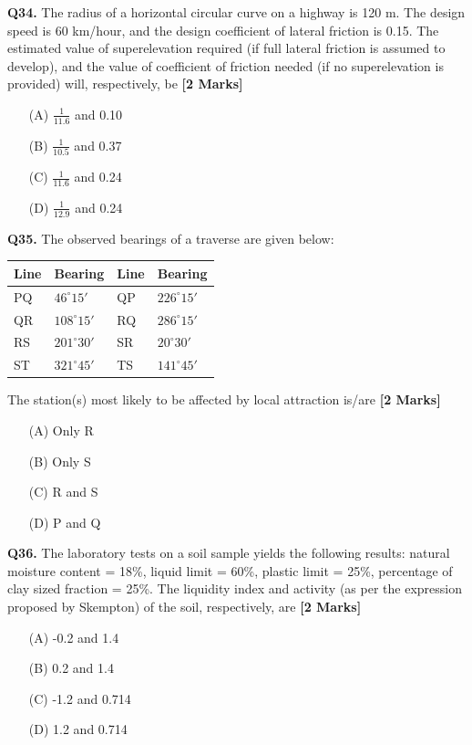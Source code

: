 \documentclass[11pt]{article}
\newcommand{\questionb}[2]{
    \noindent\textbf{Q#2.} #1 \hfill \textbf{[2 Marks]}
}
\begin{document}
\vspace{0.5cm}

\questionb{The radius of a horizontal circular curve on a highway is 120 m. The design speed is 60 km/hour, and the design coefficient of lateral friction is 0.15. The estimated value of superelevation required (if full lateral friction is assumed to develop), and the value of coefficient of friction needed (if no superelevation is provided) will, respectively, be}{34}
\begin{enumerate}
    \item[(A)] $\frac{1}{11.6}$ and 0.10
    \item[(B)] $\frac{1}{10.5}$ and 0.37
    \item[(C)] $\frac{1}{11.6}$ and 0.24
    \item[(D)] $\frac{1}{12.9}$ and 0.24
\end{enumerate}

\vspace{0.5cm}

\questionb{The observed bearings of a traverse are given below:
\begin{center}
\begin{tabular}{|l|l|l|l|}
\hline
Line & Bearing & Line & Bearing \\
\hline
PQ & $46^\circ15'$ & QP & $226^\circ15'$ \\
QR & $108^\circ15'$ & RQ & $286^\circ15'$ \\
RS & $201^\circ30'$ & SR & $20^\circ30'$ \\
ST & $321^\circ45'$ & TS & $141^\circ45'$ \\
\hline
\end{tabular}
\end{center}
The station(s) most likely to be affected by local attraction is/are}{35}
\begin{enumerate}
    \item[(A)] Only R
    \item[(B)] Only S
    \item[(C)] R and S
    \item[(D)] P and Q
\end{enumerate}

\vspace{0.5cm}

\questionb{The laboratory tests on a soil sample yields the following results: natural moisture content = 18\%, liquid limit = 60\%, plastic limit = 25\%, percentage of clay sized fraction = 25\%. The liquidity index and activity (as per the expression proposed by Skempton) of the soil, respectively, are}{36}
\begin{enumerate}
    \item[(A)] -0.2 and 1.4
    \item[(B)] 0.2 and 1.4
    \item[(C)] -1.2 and 0.714
    \item[(D)] 1.2 and 0.714
\end{enumerate}
\end{document}
